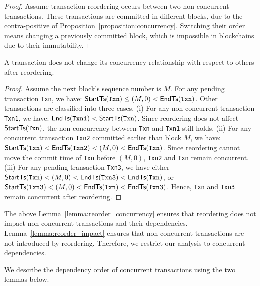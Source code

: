 \begin{proof} 
  Assume transaction reordering occurs between two non-concurrent transactions.
  These transactions are committed in different blocks, due to the
  contra-positive of Proposition~\ref{proposition:concurrency}. Switching their order means changing a previously committed block, which is impossible in blockchains due
  to their immutability.
\end{proof}

\begin{lemma} 
  \label{lemma:reorder_impact}
  A transaction does not change its concurrency relationship with respect to
  others after reordering.
\end{lemma}

\begin{proof}
  Assume the next block's sequence number is $M$.
  For any pending transaction \texttt{Txn}, we have: $\textsf{StartTs}(\texttt{Txn}) \le (M,0) <
  \textsf{EndTs}(\texttt{Txn})$.
  Other transactions are classified into three cases.
  (i) For any non-concurrent transaction \texttt{Txn1}, we have:
  $\textsf{EndTs}(\texttt{Txn1}) < \textsf{StartTs}(\texttt{Txn})$.
  Since reordering does not affect $\textsf{StartTs}(\texttt{Txn})$, the non-concurrency between
  \texttt{Txn} and \texttt{Txn1} still holds.
  (ii) For any concurrent transaction \texttt{Txn2} committed earlier than block
  $M$, we have: $\textsf{StartTs}(\texttt{Txn}) < \textsf{EndTs}(\texttt{Txn2}) < (M,0) < \textsf{EndTs}(\texttt{Txn})$.
  Since reordering cannot move the commit time of \texttt{Txn} before $(M,0)$,
  \texttt{Txn2} and \texttt{Txn} remain concurrent.
  (iii) For any pending transaction \texttt{Txn3},  we have either $\textsf{StartTs}(\texttt{Txn}) < (M, 0) < \textsf{EndTs}(\texttt{Txn3}) < \textsf{EndTs}(\texttt{Txn})$, or $\textsf{StartTs}(\texttt{Txn3}) < (M, 0) < \textsf{EndTs}(\texttt{Txn}) < \textsf{EndTs}(\texttt{Txn3})$.
  Hence, \texttt{Txn} and \texttt{Txn3} remain concurrent after reordering.
\end{proof}

The above Lemma~\ref{lemma:reorder_concurrency} ensures that reordering does not
impact non-concurrent transactions and their dependencies.
%
Lemma~\ref{lemma:reorder_impact} ensures that non-concurrent transactions are not
introduced by reordering.
%
Therefore, we restrict our analysis to concurrent dependencies.

We describe the dependency order of concurrent transactions using the two lemmas below.

